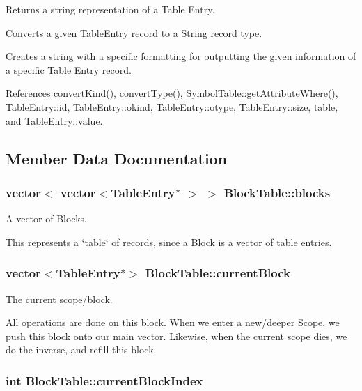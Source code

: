 Returns a string representation of a Table Entry. 

Converts a given \hyperlink{structTableEntry}{TableEntry} record to a String record type.

Creates a string with a specific formatting for outputting the given information of a specific Table Entry record. 

References convertKind(), convertType(), SymbolTable::getAttributeWhere(), TableEntry::id, TableEntry::okind, TableEntry::otype, TableEntry::size, table, and TableEntry::value.



\subsection{Member Data Documentation}
\hypertarget{classBlockTable_a218731f3bdcdcc1aefe6f7e040693e39}{
\subsubsection[{blocks}]{\setlength{\rightskip}{0pt plus 5cm}vector$<$ vector$<${\bf TableEntry}$\ast$ $>$ $>$ {\bf BlockTable::blocks}}}
\label{classBlockTable_a218731f3bdcdcc1aefe6f7e040693e39}


A vector of Blocks. 

This represents a \char`\"{}table\char`\"{} of records, since a Block is a vector of table entries. \hypertarget{classBlockTable_a6a762febfc7063228de04cdd6b3490cb}{
\subsubsection[{currentBlock}]{\setlength{\rightskip}{0pt plus 5cm}vector$<${\bf TableEntry}$\ast$$>$ {\bf BlockTable::currentBlock}}}
\label{classBlockTable_a6a762febfc7063228de04cdd6b3490cb}


The current scope/block. 

All operations are done on this block. When we enter a new/deeper Scope, we push this block onto our main vector. Likewise, when the current scope dies, we do the inverse, and refill this block. \hypertarget{classBlockTable_a88b835ac538211364f1bd369edb5d1f3}{
\subsubsection[{currentBlockIndex}]{\setlength{\rightskip}{0pt plus 5cm}int {\bf BlockTable::currentBlockIndex}}}
\label{classBlockTable_a88b835ac538211364f1bd369edb5d1f3}


